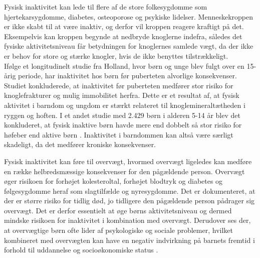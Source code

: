 
Fysisk inaktivitet kan lede til flere af de store folkesygdomme som hjertekarsygdomme, diabetes, osteoporose og psykiske lidelser. Menneskekroppen er ikke skabt til at være inaktiv, og derfor vil kroppen reagere kraftigt på det. Eksempelvis kan kroppen begynde at nedbryde knoglerne indefra, således det fysiske aktivitetsniveau får betydningen for knoglernes samlede vægt, da der ikke er behov for store og stærke knogler, hvis de ikke benyttes tilstrækkeligt. \citep{Kiens2007,Reshma2002,Martini2012} \\
Ifølge et longitudinelt studie fra Holland, hvor børn og unge blev fulgt over en 15-årig periode, har inaktivitet hos børn før puberteten alvorlige konsekvenser. Studiet konkluderede, at inaktivitet før puberteten medfører stor risiko for knoglefrakturer og mulig immobilitet herfra. Dette er et resultat af, at fysisk aktivitet i barndom og ungdom er stærkt relateret til knoglemineraltætheden i ryggen og hoften. \citep{Kemper2000} I et andet studie med 2.429 børn i alderen 5-14 år blev det konkluderet, at fysisk inaktive børn havde mere end dobbelt så stor risiko for høfeber end aktive børn \citep{Kohlhammer2006}. Inaktivitet i barndommen kan altså være særligt skadeligt, da det medfører kroniske konsekvenser.

Fysisk inaktivitet kan føre til overvægt, hvormed overvægt ligeledes kan medføre en række helbredsmæssige konsekvenser for den pågældende person. Overvægt øger risikoen for forhøjet kolesteroltal, forhøjet blodtryk og diabetes og følgesygdomme heraf som slagtilfælde og nyresygdomme. Det er dokumenteret, at der er større risiko for tidlig død, jo tidligere den pågældende person pådrager sig overvægt. Det er derfor essentielt at øge børns aktivitetsniveau og dermed mindske risikoen for inaktivitet i kombination med overvægt. \citep{Nestle2014} Derudover ses der, at overvægtige børn ofte lider af psykologiske og sociale problemer, hvilket kombineret med overvægten kan have en negativ indvirkning på barnets fremtid i forhold til uddannelse og socioøkonomiske status \citep{Academic2016}.

